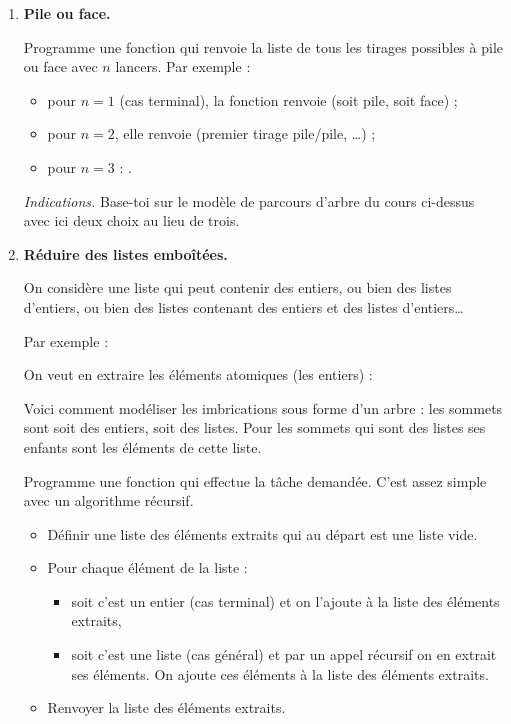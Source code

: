 \documentclass[11pt,class=report,crop=false]{standalone}
\begin{document}
\begin{activite}
   

\begin{enumerate}
  \item \textbf{Pile ou face.}
  
  Programme une fonction  qui renvoie la liste de tous les tirages possibles à pile ou face avec $n$ lancers.
  Par exemple :
  \begin{itemize}
    \item pour $n=1$ (cas terminal), la fonction renvoie \ci{['P','F']} (soit pile, soit face) ;
    \item pour $n=2$, elle renvoie \ci{['PP','PF','FP','FF']} (premier tirage pile/pile, \ldots) ;
    \item pour $n=3$ : .
  \end{itemize}
  
  \emph{Indications.} Base-toi sur le modèle de parcours d'arbre du cours ci-dessus avec ici deux choix au lieu de trois.
  

  \item \textbf{Réduire des listes emboîtées.}
  
  On considère une liste qui peut contenir des entiers, ou bien des listes d'entiers, ou bien des listes contenant des entiers et des listes d'entiers\ldots
  
  Par exemple :
  
  On veut en extraire les éléments atomiques (les entiers) : 
  \mycenterline{\ci{[1, 2, 3, 9, 8, 7, 6, 5, 1, 2, 3]}}
  
  Voici comment modéliser les imbrications sous forme d'un arbre : les sommets sont soit des entiers, soit des listes. Pour les sommets qui sont des listes ses enfants sont les éléments de cette liste.


  Programme une fonction  qui effectue la tâche demandée.
  C'est assez simple avec un algorithme récursif. 
  \begin{itemize} 
    \item Définir une liste des éléments extraits qui au départ est une liste vide.
    \item Pour chaque élément de la liste :
  \begin{itemize}
    \item soit c'est un entier (cas terminal) et on l'ajoute à la liste des éléments extraits,
    \item soit c'est une liste (cas général) et par un appel récursif on en extrait ses éléments. On ajoute ces éléments à la liste des éléments extraits. 
  \end{itemize}
    \item Renvoyer la liste des éléments extraits.
    

\end{itemize}
\end{enumerate}
\end{activite}
\end{document}
